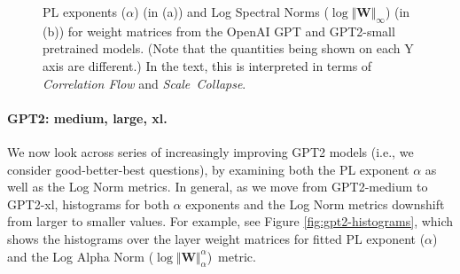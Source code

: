 \begin{figure}[htb]
    \centering
    \quad
    \caption{PL exponents ($\alpha$) (in (a)) and Log Spectral Norms ($\log\Vert\mathbf{W}\Vert_{\infty}$) (in (b)) for weight matrices from the OpenAI GPT and GPT2-small pretrained models.  (Note that the quantities being shown on each Y axis are different.)
             In the text, this is interpreted in terms of \emph{Correlation Flow} and \emph{Scale~Collapse}.
            }
    \label{fig:gpt-alpha-layers}
\end{figure}


\paragraph{GPT2: medium, large, xl.} 

We now look across series of increasingly improving GPT2 models (i.e., we consider good-better-best questions), by examining both the PL exponent $\alpha$ as well as the Log Norm metrics.  
In general, as we move from GPT2-medium to GPT2-xl, histograms for both $\alpha$ exponents and the Log Norm metrics downshift from larger to smaller values. 
For example, see Figure \ref{fig:gpt2-histograms}, which shows the histograms over the layer weight matrices for fitted PL exponent ($\alpha$) and the Log Alpha Norm ($\log\Vert\mathbf{W}\Vert_{\alpha}^{\alpha}$)~metric.

